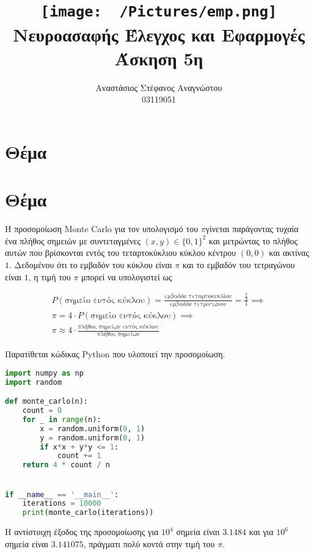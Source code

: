 \documentclass{article}
\title{
    \texttt{[image: ~/Pictures/emp.png]} \\
    \vskip 5cm
    Νευροασαφής Έλεγχος και Εφαρμογές\\
    \large Άσκηση 5η
    \vskip 5cm
}
\author{Αναστάσιος Στέφανος Αναγνώστου\\
        03119051}
\newcommand{\eng}[1]{\foreignlanguage{english}{#1}} %
\begin{document}
\maketitle
\newpage
\tableofcontents
\newpage

\section{Θέμα}



\section{Θέμα}

Η προσομοίωση \eng{Monte Carlo} για τον υπολογισμό του $\pi$γίνεται παράγοντας
τυχαία ένα πλήθος σημειών με συντεταγμένες $(x, y) \in \{0, 1\}^2$ και
μετρώντας το πλήθος αυτών που βρίσκονται εντός του τεταρτοκύκλιου κύκλου
κέντρου $(0, 0)$ και ακτίνας $1$. Δεδομένου ότι το εμβαδόν του κύκλου είναι
$\pi$ και το εμβαδόν του τετραγώνου είναι $1$, η τιμή του $\pi$ μπορεί να
υπολογιστεί ως

\begin{equation}
    \begin{gathered}
    P(\text{σημείο εντός κύκλου}) = \frac{\text{εμβαδόν τεταρτοκυκλίου}}{\text{εμβαδόν τετραγώνου}} = \frac{\frac{\pi}{4}}{1} \implies \\
    \pi = 4 \cdot P(\text{σημείο εντός κύκλου}) \implies \\
    \pi \approx 4 \cdot \frac{\text{πλήθος σημείων εντός κύκλου}}{\text{πλήθος σημείων}}
    \end{gathered}
\end{equation}

Παρατίθεται κώδικας \eng{Python} που υλοποιεί την προσομοίωση.

\begin{lstlisting}[language=Python]
import numpy as np
import random

def monte_carlo(n):
    count = 0
    for _ in range(n):
        x = random.uniform(0, 1)
        y = random.uniform(0, 1)
        if x*x + y*y <= 1:
            count += 1
    return 4 * count / n


if __name__ == '__main__':
    iterations = 10000
    print(monte_carlo(iterations))
\end{lstlisting}

Η αντίστοιχη έξοδος της προσομοίωσης για $10^4$ σημεία είναι $3.1484$ και για
$10^6$ σημεία είναι $3.141075$, πράγματι πολύ κοντά στην τιμή του $\pi$.
\end{document}
